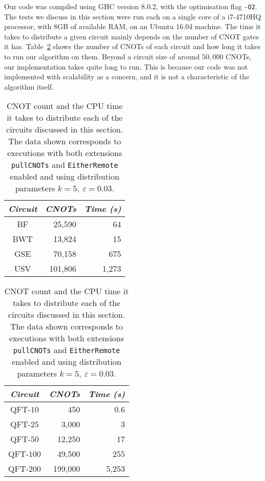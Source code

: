 Our code was compiled using GHC version 8.0.2, with the optimisation flag \texttt{-O2}. The tests we discuss in this section were run each on a single core of a i7-4710HQ processor, with 8GB of available RAM, on an Ubuntu 16.04 machine. The time it takes to distribute a given circuit mainly depends on the number of CNOT gates it has. Table~\ref{tab:time} shows the number of CNOTs of each circuit and how long it takes to run our algorithm on them. Beyond a circuit size of around \(50,000\) CNOTs, our implementation takes quite long to run. This is because our code was not implemented with scalability as a concern, and it is not a characteristic of the algorithm itself.

\begin{table}
\caption{CNOT count and the CPU time it takes to distribute each of the circuits discussed in this section. The data shown corresponds to executions with both extensions \texttt{pullCNOTs} and \texttt{EitherRemote} enabled and using distribution parameters \(k\!=\!5,\ \varepsilon\!=\!0.03\).}
\label{tab:time}
\centering
\vspace*{3mm}
\begin{tabular}{|c|r|r|}
\hline
\textit{Circuit} & \textit{CNOTs} & \textit{Time (s)} \\
\hline
\small
{\small BF} & {\small 25,590} & {\small 64} \\
{\small BWT} & {\small 13,824} & {\small 15} \\
{\small GSE} & {\small 70,158} & {\small 675} \\
{\small USV} & {\small 101,806} & {\small 1,273}\\
\hline
\end{tabular}
\hspace{10mm}
\begin{tabular}{|c|r|r|}
\hline
\textit{Circuit} & \textit{CNOTs} & \textit{Time (s)} \\
\hline
{\small QFT-\(10\)} & {\small 450} & {\small 0.6} \\
{\small QFT-\(25\)} & {\small 3,000} & {\small 3} \\
{\small QFT-\(50\)} & {\small 12,250} & {\small 17} \\
{\small QFT-\(100\)} & {\small 49,500} & {\small 255} \\
{\small QFT-\(200\)} & {\small 199,000} & {\small 5,253} \\
\hline
\end{tabular}
\end{table}

